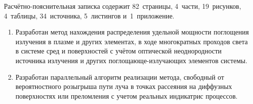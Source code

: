 

Расчётно-пояснительная записка содержит 82~страницы, 4~части, 19~рисунков, 4~таблицы, 34~источника, 5~листингов и~1~приложение.


\begin{enumerate}

	\item Разработан метод нахождения распределения удельной мощности поглощения излучения в плазме и других элементах, в ходе многократных проходов света в системе сред и поверхностей с учётом оптической неоднородности источника излучения и других поглощающе-излучающих элементов системы.

	\item Разработан параллельный алгоритм реализации метода, свободный от вероятностного розыгрыша пути луча в точках рассеяния на диффузных поверхностях или преломления с учетом реальных индикатрис процессов.

\end{enumerate}
